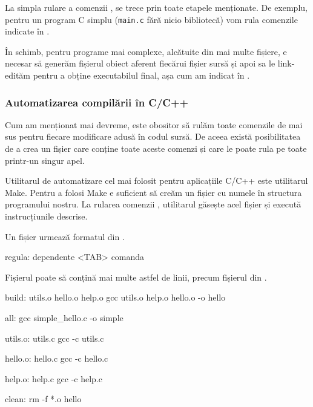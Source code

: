 La simpla rulare a comenzii , se trece prin toate etapele menționate.
De exemplu, pentru un program C simplu (\texttt{main.c} fără nicio bibliotecă) vom rula comenzile indicate în .

În schimb, pentru programe mai complexe, alcătuite din mai multe fișiere, e necesar să generăm fișierul obiect aferent fiecărui fișier sursă și apoi sa le link-edităm pentru a obține executabilul final, așa cum am indicat în .

\subsubsection{Automatizarea compilării în C/C++}
\label{sec:appdev:dev-env:c-dev}

Cum am menționat mai devreme, este obositor să rulăm toate comenzile de mai sus pentru fiecare modificare adusă în codul sursă.
De aceea există posibilitatea de a crea un fișier care conține toate aceste comenzi și care le poate rula pe toate printr-un singur apel.

Utilitarul de automatizare cel mai folosit pentru aplicațiile C/C++ este utilitarul Make.
Pentru a folosi Make e suficient să creăm un fișier cu numele  în structura programului nostru.
La rularea comenzii , utilitarul găsește acel fișier și execută instrucțiunile descrise.

Un fișier  urmează formatul din .

\begin{screen}[caption={Formatul unui fișier Maefile},label={lst:appdev:makefile-format}]
regula: dependente
<TAB> comanda
\end{screen}

Fișierul poate să conțină mai multe astfel de linii, precum fișierul  din .

\begin{screen}[caption={Exemplu Makefile},label={lst:appdev:makefile}]
build: utils.o hello.o help.o
       gcc utils.o help.o hello.o -o hello

all:
       gcc simple_hello.c -o simple

utils.o: utils.c
       gcc -c utils.c

hello.o: hello.c
       gcc -c hello.c

help.o: help.c
       gcc -c help.c

clean:
       rm -f *.o hello
\end{screen}

